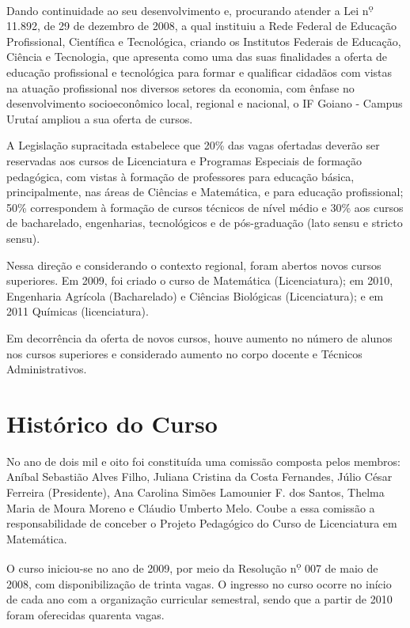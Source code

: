 Dando continuidade ao seu desenvolvimento e, procurando atender a Lei
n\textsuperscript{\d o} 11.892, de 29 de dezembro de 2008, a qual
instituiu a Rede Federal de Educação Profissional, Científica e
Tecnológica, criando os Institutos Federais de Educação, Ciência e
Tecnologia, que apresenta como uma das suas finalidades a oferta de
educação profissional e tecnológica para formar e qualificar cidadãos
com vistas na atuação profissional nos diversos setores da economia,
com ênfase no desenvolvimento socioeconômico local, regional e
nacional, o IF Goiano - Campus Urutaí ampliou a sua oferta de cursos.

A Legislação supracitada estabelece que 20\% das vagas ofertadas
deverão ser reservadas aos cursos de Licenciatura e Programas
Especiais de formação pedagógica, com vistas à formação de professores
para educação básica, principalmente, nas áreas de Ciências e
Matemática, e para educação profissional; 50\% correspondem à formação
de cursos técnicos de nível médio e 30\% aos cursos de bacharelado,
engenharias, tecnológicos e de pós-graduação (lato sensu e stricto
sensu).

Nessa direção e considerando o contexto regional, foram abertos novos
cursos superiores.  Em 2009, foi criado o curso de Matemática
(Licenciatura); em 2010, Engenharia Agrícola (Bacharelado) e Ciências
Biológicas (Licenciatura); e em 2011 Químicas (licenciatura).

Em decorrência da oferta de novos cursos, houve aumento no número de
alunos nos cursos superiores e considerado aumento no corpo docente e
Técnicos Administrativos.

\section{Hist\'{o}rico do Curso}
\label{sec:historico-curso}

No ano de dois mil e oito foi constituída uma comissão composta pelos
membros: Aníbal Sebastião Alves Filho, Juliana Cristina da Costa
Fernandes, Júlio César Ferreira (Presidente), Ana Carolina Simões
Lamounier F.  dos Santos, Thelma Maria de Moura Moreno e Cláudio
Umberto Melo.  Coube a essa comissão a responsabilidade de conceber o
Projeto Pedagógico do Curso de Licenciatura em Matemática.

O curso iniciou-se no ano de 2009, por meio da Resolução
n\textsuperscript{\d o} 007 de maio de 2008, com disponibilização de
trinta vagas. O ingresso no curso ocorre no início de cada ano com a
organização curricular semestral, sendo que a partir de 2010 foram
oferecidas quarenta vagas.

